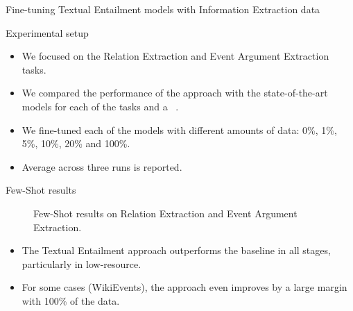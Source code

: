 \documentclass[
    11pt,
    notheorems,
    xcolor={dvipsnames},
    hyperref={
        pdfstartview=FitH, 
        pdftitle={Ikasketa-adibide urriko Informazio-Erauzketa}, 
        pdfauthor={Oscar Sainz Jimenez}, 
        citecolor=secondary, 
    }
]{beamer}
\begin{document}
\begin{frame}
\begin{block}{Fine-tuning Textual Entailment models with Information Extraction data}
\begin{figure}

        \end{figure}

    \end{block}
\end{frame}

\begin{frame}
    \begin{block}{Experimental setup}
        \begin{itemize}
            \item We focused on the Relation Extraction and Event Argument Extraction tasks.
            \item We compared the performance of the approach with the state-of-the-art models for each of the tasks and a ~\citep{baldini-soares-etal-2019-matching}.
            \item We fine-tuned each of the models with different amounts of data: 0\%, 1\%, 5\%, 10\%, 20\% and 100\%.
            \item Average across three runs is reported.
        \end{itemize}

    \end{block}

\end{frame}

\begin{frame}
    \begin{block}{Few-Shot results}
        \begin{figure}
            \centering
            \resizebox{.9\textwidth}{!}{
                
            }
            \caption{Few-Shot results on Relation Extraction and Event Argument Extraction.}
        \end{figure}
    \end{block}

    \begin{itemize}
        \item The Textual Entailment approach outperforms the baseline in all stages, particularly in low-resource.
        \item For some cases (WikiEvents), the approach even improves by a large margin with 100\% of the data.
    \end{itemize}

\end{frame}
\end{document}

